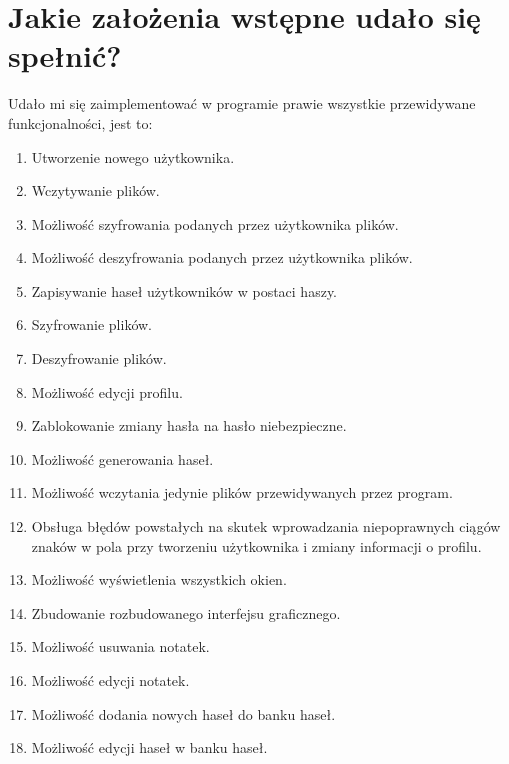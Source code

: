 \documentclass[a4paper]{article}
\begin{document}
\section{Jakie założenia wstępne udało się spełnić?}
Udało mi się zaimplementować w programie prawie wszystkie przewidywane funkcjonalności, jest to:
\begin{enumerate}
    \item Utworzenie nowego użytkownika.
    \item Wczytywanie plików.
    \item Możliwość szyfrowania podanych przez użytkownika plików.
    \item Możliwość deszyfrowania podanych przez użytkownika plików.
    \item Zapisywanie haseł użytkowników w postaci haszy.
    \item Szyfrowanie plików.
    \item Deszyfrowanie plików.
    \item Możliwość edycji profilu.
    \item Zablokowanie zmiany hasła na hasło niebezpieczne.
    \item Możliwość generowania haseł.
    \item Możliwość wczytania jedynie plików przewidywanych przez program.
    \item Obsługa błędów powstałych na skutek wprowadzania niepoprawnych ciągów znaków w pola przy tworzeniu użytkownika i zmiany informacji o profilu.
    \item Możliwość wyświetlenia wszystkich okien.
    \item Zbudowanie rozbudowanego interfejsu graficznego.
    \item Możliwość usuwania notatek.
    \item Możliwość edycji notatek.
    \item Możliwość dodania nowych haseł do banku haseł.
    \item Możliwość edycji haseł w banku haseł.
\end{enumerate}
\end{document}
